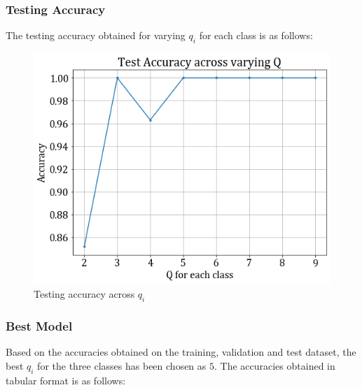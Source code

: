 \documentclass[11pt,a4paper]{article}
\begin{document}
\subsubsection{Testing Accuracy}
The testing accuracy obtained for varying $q_i$ for each class is as follows:
\begin{figure}[H]
    \centering
    \includegraphics[scale=0.45]{images/1b_full_test.png}
    \caption{Testing accuracy across $q_i$}
\end{figure}

\subsubsection{Best Model}
Based on the accuracies obtained on the training, validation and test dataset, the best $q_i$ for the three classes has been chosen as $5$. The accuracies obtained in tabular format is as follows:

\end{document}
